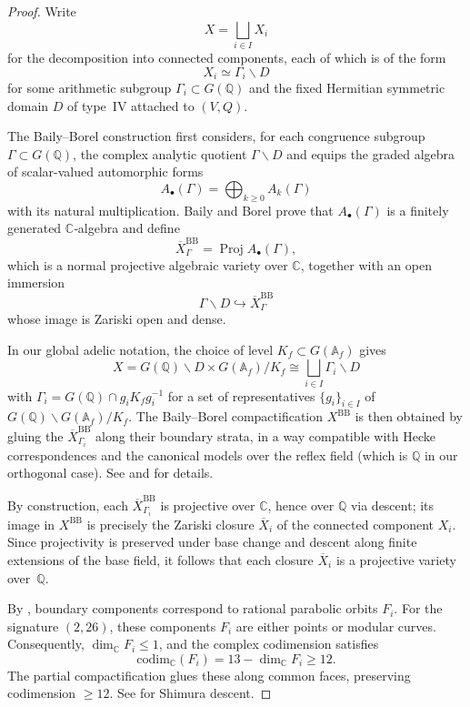 \documentclass[12pt]{amsart}
\theoremstyle{definition}
\begin{document}
\begin{proof}


Write
\[
X = \bigsqcup_{i \in I} X_i
\]
for the decomposition into connected components, each of which is of the form
\[
X_i \simeq \Gamma_i \backslash D
\]
for some arithmetic subgroup $\Gamma_i \subset G(\mathbb{Q})$ and the fixed Hermitian symmetric domain
$D$ of type~IV attached to $(V,Q)$.

The Baily--Borel construction first considers, for each congruence subgroup $\Gamma \subset G(\mathbb{Q})$,
the complex analytic quotient $\Gamma \backslash D$ and equips the graded algebra of scalar-valued
automorphic forms
\[
A_\bullet(\Gamma) = \bigoplus_{k \ge 0} A_k(\Gamma)
\]
with its natural multiplication. Baily and Borel prove that $A_\bullet(\Gamma)$ is a finitely generated
$\mathbb{C}$‑algebra and define
\[
\overline{X}_\Gamma^{\text{BB}} = \operatorname{Proj} A_\bullet(\Gamma),
\]
which is a normal projective algebraic variety over $\mathbb{C}$, together with an open immersion
\[
\Gamma \backslash D \hookrightarrow \overline{X}_\Gamma^{\text{BB}}
\]
whose image is Zariski open and dense.

In our global adelic notation, the choice of level $K_f \subset G(\mathbb{A}_f)$ gives
\[
X = G(\mathbb{Q}) \backslash D \times G(\mathbb{A}_f)/K_f \cong 
\bigsqcup_{i \in I} \Gamma_i \backslash D
\]
with $\Gamma_i = G(\mathbb{Q}) \cap g_i K_f g_i^{-1}$ for a set of representatives
$\{g_i\}_{i \in I}$ of $G(\mathbb{Q}) \backslash G(\mathbb{A}_f)/K_f$. 
The Baily--Borel compactification $X^{\text{BB}}$ is then obtained by gluing the
${\overline{X}}_{\Gamma_i}^{\text{BB}}$ along their boundary strata, in a way compatible with Hecke correspondences
and the canonical models over the reflex field (which is $\mathbb{Q}$ in our orthogonal case).  See
\cite[§4–5]{Baily-Borel} and \cite[§5]{Deligne-Shimura} for details. 

By construction, each $\overline{X}_{\Gamma_i}^{\text{BB}}$ is projective over $\mathbb{C}$, hence over
$\mathbb{Q}$ via descent; its image in $X^{\text{BB}}$ is precisely the Zariski closure $\overline{X}_i$ of the
connected component $X_i$.  Since projectivity is preserved under base change and descent along finite
extensions of the base field, it follows that each closure $\overline{X}_i$ is a projective variety
over~$\mathbb{Q}$.

By \cite[Thm.~4.12]{Baily-Borel}, boundary components correspond to rational parabolic orbits $F_i$. For the signature $(2, 26)$, these components $F_i$ are either points or modular curves. Consequently, $\dim_{\mathbb{C}} F_i \leq 1$, and the complex codimension satisfies $$\mathrm{codim}_{\mathbb{C}}(F_i) = 13 - \dim_{\mathbb{C}} F_i \geq 12.$$
The partial compactification glues these along common faces, preserving codimension $\geq 12$. See \cite[\S 5]{Deligne-Shimura} for Shimura descent.
\end{proof}
\end{document}
